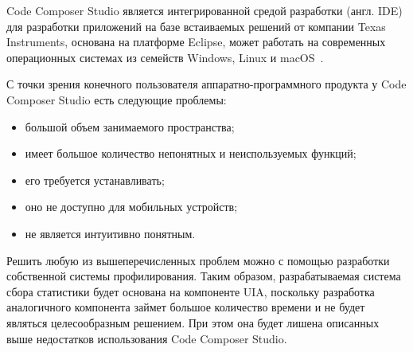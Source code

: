 Code Composer Studio является интегрированной средой разработки (англ. IDE)
для разработки приложений на базе встаиваемых решений от компании Texas Instruments,
основана на платформе Eclipse, может работать на современных
операционных системах из семейств Windows, Linux и
macOS~\cite{ccs_ti_site}.%

С точки зрения конечного пользователя аппаратно-программного продукта
у Code Composer Studio есть следующие проблемы:
\begin{itemize}
    \item большой объем занимаемого пространства;
    \item имеет большое количество непонятных и неиспользуемых функций;
    \item его требуется устанавливать;
    \item оно не доступно для мобильных устройств;
    \item не является интуитивно понятным.
\end{itemize}


Решить любую из вышеперечисленных проблем можно с помощью разработки собственной
системы профилирования. Таким образом, разрабатываемая система сбора статистики
будет основана на компоненте UIA,
поскольку разработка аналогичного компонента займет большое количество времени
и не будет являться целесообразным решением. При этом она будет лишена описанных
выше недостатков использования Code Composer Studio.


